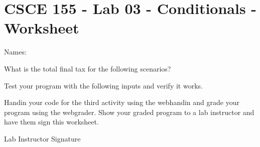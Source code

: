 \documentclass[12pt]{exam}
\begin{document}
\section*{CSCE 155 - Lab 03 - Conditionals - Worksheet}

Names: \underline{\hspace{10cm}}

\begin{questions}

\question What is the total final tax for the following scenarios?

\question Test your program with the following inputs and verify it works.

\question Handin your code for the third activity using the webhandin and
grade your program using the webgrader.  Show your graded program to a lab 
instructor and have them sign this worksheet.
\end{questions}
  
Lab Instructor Signature\underline{\hspace{7.5cm}}
\end{document}
